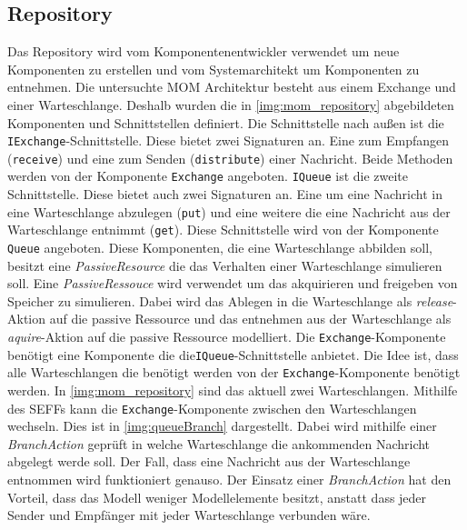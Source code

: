 \subsection{Repository}
Das Repository wird vom Komponentenentwickler verwendet um neue Komponenten zu erstellen und vom Systemarchitekt um Komponenten zu entnehmen. Die untersuchte MOM Architektur besteht aus einem Exchange und einer Warteschlange. Deshalb wurden die in \autoref{img:mom_repository} abgebildeten Komponenten und Schnittstellen definiert. Die Schnittstelle nach außen ist die \texttt{IExchange}-Schnittstelle. Diese bietet zwei Signaturen an. Eine zum Empfangen (\texttt{receive}) und eine zum Senden (\texttt{distribute}) einer Nachricht. Beide Methoden werden von der Komponente \texttt{Exchange} angeboten. \texttt{IQueue} ist die zweite Schnittstelle. Diese bietet auch zwei Signaturen an. Eine um eine Nachricht in eine Warteschlange abzulegen (\texttt{put}) und eine weitere die eine Nachricht aus der Warteschlange entnimmt (\texttt{get}). Diese Schnittstelle wird von der Komponente \texttt{Queue} angeboten. Diese Komponenten, die eine Warteschlange abbilden soll, besitzt eine \emph{PassiveResource} die das Verhalten einer Warteschlange simulieren soll. Eine \emph{PassiveRessouce} wird verwendet um das akquirieren und freigeben von Speicher zu simulieren. Dabei wird das Ablegen in die Warteschlange als \emph{release}-Aktion auf die passive Ressource und das entnehmen aus der Warteschlange als \emph{aquire}-Aktion auf die passive Ressource modelliert. Die \texttt{Exchange}-Komponente benötigt eine Komponente die die\texttt{IQueue}-Schnittstelle anbietet. Die Idee ist, dass alle Warteschlangen die benötigt werden von der \texttt{Exchange}-Komponente benötigt werden. In \autoref{img:mom_repository} sind das aktuell zwei Warteschlangen. Mithilfe des SEFFs kann die \texttt{Exchange}-Komponente zwischen den Warteschlangen wechseln. Dies ist in \autoref{img:queueBranch} dargestellt. Dabei wird mithilfe einer \emph{BranchAction} geprüft in welche Warteschlange die ankommenden Nachricht abgelegt werde soll. Der Fall, dass eine Nachricht aus der Warteschlange entnommen wird funktioniert genauso. Der Einsatz einer \emph{BranchAction} hat den Vorteil, dass das Modell weniger Modellelemente besitzt, anstatt dass jeder Sender und Empfänger mit jeder Warteschlange verbunden wäre.




